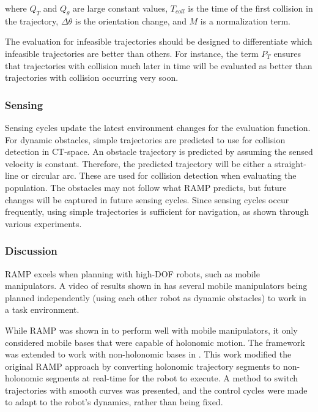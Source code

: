 \documentclass[10pt,conference]{ieeeconf}
\begin{document}
where $Q_T$ and $Q_θ$ are large constant values, $T_{coll}$ is the time
of the first collision in the trajectory, $\Delta\theta$ is the orientation change, and $M$ is a normalization term.

The evaluation for infeasible trajectories should be designed to differentiate which infeasible trajectories are better than others. For instance, the term $P_T$ ensures that trajectories with collision much later in time will be evaluated as better than trajectories with collision occurring very soon.

\subsubsection{Sensing}

Sensing cycles update the latest environment changes for the evaluation function. For dynamic obstacles, simple trajectories are predicted to use for collision detection in CT-space. An obstacle trajectory is predicted by assuming the sensed velocity is constant. Therefore, the predicted trajectory will be either a straight-line or circular arc. These are used for collision detection when evaluating the population. The obstacles may not follow what RAMP predicts, but future changes will be captured in future sensing cycles. Since sensing cycles occur frequently, using simple trajectories is sufficient for navigation, as shown through various experiments.


\subsubsection{Discussion}

RAMP excels when planning with high-DOF robots, such as mobile manipulators. A video of results shown in \cite{RAMP} has several mobile manipulators being planned independently (using each other robot as dynamic obstacles) to work in a task environment.

While RAMP was shown in \cite{RAMP} to perform well with mobile manipulators, it only considered mobile bases that were capable of holonomic motion. The framework was extended to work with non-holonomic bases in \cite{mcleod2016real}. This work modified the original RAMP approach by converting holonomic trajectory segments to non-holonomic segments at real-time for the robot to execute. A method to switch trajectories with smooth curves was presented, and the control cycles were made to adapt to the robot's dynamics, rather than being fixed.
\end{document}
